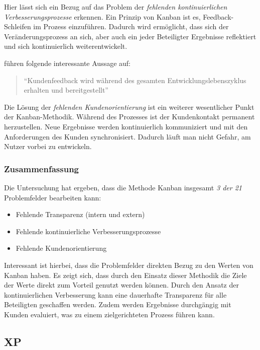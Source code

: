 Hier lässt sich ein Bezug auf das Problem der \textit{fehlenden kontinuierlichen Verbesserungsprozesse} erkennen. Ein Prinzip von Kanban ist es, Feedback-Schleifen im Prozess einzuführen. Dadurch wird ermöglicht, dass sich der Veränderungsprozess an sich, aber auch ein jeder Beteiligter Ergebnisse reflektiert und sich kontinuierlich weiterentwickelt. 

 führen folgende interessante Aussage auf:

\begin{quote}
	``Kundenfeedback wird während des gesamten Entwicklungslebenszyklus erhalten und bereitgestellt'' \cite[S. 7]{rodriguez_combining_2014}
\end{quote}

Die Lösung der \textit{fehlenden Kundenorientierung} ist ein weiterer wesentlicher Punkt der Kanban-Methodik. Während des Prozesses ist der Kundenkontakt permanent herzustellen. Neue Ergebnisse werden kontinuierlich kommuniziert und mit den Anforderungen des Kunden synchronisiert. Dadurch läuft man nicht Gefahr, am Nutzer vorbei zu entwickeln.


\subsubsection{Zusammenfassung}

Die Untersuchung hat ergeben, dass die Methode Kanban insgesamt \textit{3 der 21} Problemfelder bearbeiten kann:

\begin{itemize}[noitemsep, topsep=0pt]
	\item Fehlende Transparenz (intern und extern)
	\item Fehlende kontinuierliche Verbesserungsprozesse
	\item Fehlende Kundenorientierung
\end{itemize}

Interessant ist hierbei, dass die Problemfelder direkten Bezug zu den Werten von Kanban haben. Es zeigt sich, dass durch den Einsatz dieser Methodik die Ziele der Werte direkt zum Vorteil genutzt werden können. Durch den Ansatz der kontinuierlichen Verbesserung kann eine dauerhafte Transparenz für alle Beteiligten geschaffen werden. Zudem werden Ergebnisse durchgängig mit Kunden evaluiert, was zu einem  zielgerichteten Prozess führen kann.  

\subsection{XP}

